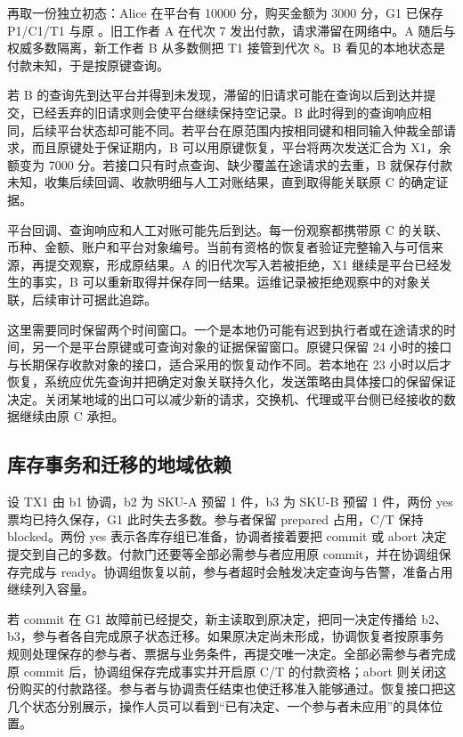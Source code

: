 再取一份独立初态：Alice 在平台有 10000 分，购买金额为 3000 分，G1 已保存 P1/C1/T1 与原 。旧工作者 A 在代次 7 发出付款，请求滞留在网络中。A 随后与权威多数隔离，新工作者 B 从多数侧把 T1 接管到代次 8。B 看见的本地状态是付款未知，于是按原键查询。


若 B 的查询先到达平台并得到未发现，滞留的旧请求可能在查询以后到达并提交，已经丢弃的旧请求则会使平台继续保持空记录。B 此时得到的查询响应相同，后续平台状态却可能不同。若平台在原范围内按相同键和相同输入仲裁全部请求，而且原键处于保证期内，B 可以用原键恢复，平台将两次发送汇合为 X1，余额变为 7000 分。若接口只有时点查询、缺少覆盖在途请求的去重，B 就保存付款未知，收集后续回调、收款明细与人工对账结果，直到取得能关联原 C 的确定证据。

平台回调、查询响应和人工对账可能先后到达。每一份观察都携带原 C 的关联、币种、金额、账户和平台对象编号。当前有资格的恢复者验证完整输入与可信来源，再提交观察，形成原结果。A 的旧代次写入若被拒绝，X1 继续是平台已经发生的事实，B 可以重新取得并保存同一结果。运维记录被拒绝观察中的对象关联，后续审计可据此追踪。

这里需要同时保留两个时间窗口。一个是本地仍可能有迟到执行者或在途请求的时间，另一个是平台原键或可查询对象的证据保留窗口。原键只保留 24 小时的接口与长期保存收款对象的接口，适合采用的恢复动作不同。若本地在 23 小时以后才恢复，系统应优先查询并把确定对象关联持久化，发送策略由具体接口的保留保证决定。关闭某地域的出口可以减少新的请求，交换机、代理或平台侧已经接收的数据继续由原 C 承担。

\subsection{库存事务和迁移的地域依赖}

设 TX1 由 b1 协调，b2 为 SKU-A 预留 1 件，b3 为 SKU-B 预留 1 件，两份 yes 票均已持久保存，G1 此时失去多数。参与者保留 prepared 占用，C/T 保持 blocked。两份 yes 表示各库存组已准备，协调者接着要把 commit 或 abort 决定提交到自己的多数。付款门还要等全部必需参与者应用原 commit，并在协调组保存完成与 ready。协调组恢复以前，参与者超时会触发决定查询与告警，准备占用继续列入容量。


若 commit 在 G1 故障前已经提交，新主读取到原决定，把同一决定传播给 b2、b3，参与者各自完成原子状态迁移。如果原决定尚未形成，协调恢复者按原事务规则处理保存的参与者、票据与业务条件，再提交唯一决定。全部必需参与者完成原 commit 后，协调组保存完成事实并开启原 C/T 的付款资格；abort 则关闭这份购买的付款路径。参与者与协调责任结束也使迁移准入能够通过。恢复接口把这几个状态分别展示，操作人员可以看到“已有决定、一个参与者未应用”的具体位置。

